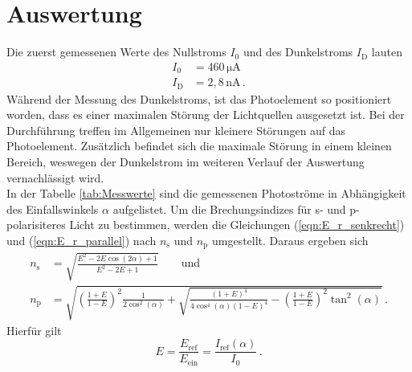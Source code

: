 


\nocite{anleitungV407}
\section{Auswertung}
\label{sec:Auswertung}
Die zuerst gemessenen Werte des Nullstroms $I_0$ und des Dunkelstroms $I_{\text{D}}$ lauten
\begin{align*}
  I_0 &= 460\,\unit{\micro\ampere}\\
  I_{\text{D}} &= 2,8\,\unit{\nano\ampere}\,.
\end{align*}
Während der Messung des Dunkelstroms, ist das Photoelement so positioniert worden, dass es einer maximalen 
Störung der Lichtquellen ausgesetzt ist. Bei der Durchführung treffen im Allgemeinen nur kleinere Störungen auf
das Photoelement. Zusätzlich befindet sich die maximale Störung in einem kleinen Bereich, weswegen der Dunkelstrom im weiteren Verlauf der Auswertung vernachlässigt wird.
\\In der Tabelle \ref{tab:Messwerte} sind die gemessenen Photoströme in Abhängigkeit des Einfallswinkels $\alpha$ aufgelistet.
Um die Brechungsindizes für s- und p-polarisiteres Licht zu bestimmen, werden die Gleichungen (\ref{eqn:E_r_senkrecht}) und (\ref{eqn:E_r_parallel}) nach $n_{\text{s}}$ und $n_{\text{p}}$
umgestellt. Daraus ergeben sich
\begin{align}
  n_{\text{s}} &= \sqrt{\frac{E^2 - 2E\cos(2\alpha) + 1}{E^2- 2E + 1}} \label{eqn:n_s} \qquad {\text{und}}\\
  n_{\text{p}} &= \sqrt{\left(\frac{1+E}{1-E}\right)^2 \frac{1}{2\cos^2(\alpha)} + \sqrt{\frac{(1+E)^4}{4\cos^4(\alpha)(1-E)^4}- \left(\frac{1+E}{1-E}\right)^2 \tan^2(\alpha)}} \label{eqn:n_p}\,.
\end{align}
Hierfür gilt $$E = \frac{E_{\text{ref}}}{E_{\text{ein}}} = \frac{I_{\text{ref}}(\alpha)}{I_0}\,.$$

